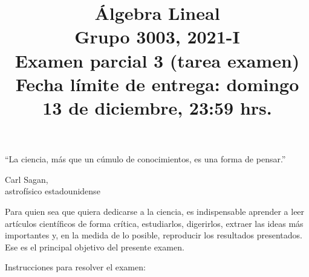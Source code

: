 \documentclass[a4paper]{article}
\begin{document}
\title{Álgebra Lineal \\ Grupo 3003, 2021-I \\ Examen parcial 3 (tarea examen) \\ Fecha límite de entrega: domingo 13 de diciembre, 23:59 hrs.}
\date{}
\maketitle

\epigraph{``La ciencia, más que un cúmulo de conocimientos, es una forma de pensar.''}{\textemdash Carl Sagan, \\ astrofísico estadounidense}

Para quien sea que quiera dedicarse a la ciencia, es indispensable aprender a leer artículos científicos de forma crítica, estudiarlos, digerirlos, extraer las ideas más importantes y, en la medida de lo posible, reproducir los resultados presentados. Ese es el principal objetivo del presente examen.

\vspace{3mm}
Instrucciones para resolver el examen: 
\end{document}
